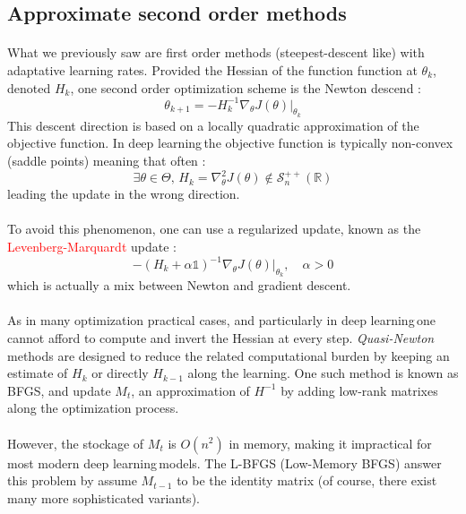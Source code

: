\documentclass[a4paper]{article}
\newcommand\dl{deep learning\,}
\begin{document}
{		\subsection{Approximate second order methods}
		{		
			\paragraph{} What we previously saw are first order methods (steepest-descent like) with adaptative learning rates. Provided the Hessian of the function function at $\theta_k$, denoted $H_k$, one second order optimization scheme is the Newton descend : 
			\begin{equation}
				\theta_{k+1} = -H_{k}^{-1}\nabla_\theta J(\theta)\vert_{\theta_k}
			\end{equation}
			This descent direction is based on a locally quadratic approximation of the objective function. In \dl the objective function is typically non-convex (saddle points) meaning that often : 
			\begin{equation}
				\exists \theta \in \Theta, \, H_k = \nabla_{\theta}^2 J(\theta) \notin \mathcal{S}_{n}^{++}(\mathbb{R})
			\end{equation}
			leading the update in the wrong direction. 
			
			\paragraph{} To avoid this phenomenon, one can use a regularized update, known as the \textcolor{red}{Levenberg-Marquardt} update : 
			\begin{equation}
				-\left(H_{k}+ \alpha \mathds{1}\right)^{-1}\nabla_\theta J(\theta)\vert_{\theta_k}, \quad \alpha >0
			\end{equation}
			which is actually a mix between Newton and gradient descent. 
			
			\paragraph{} As in many optimization practical cases, and particularly in \dl one cannot afford to compute and invert the Hessian at every step. \emph{Quasi-Newton} methods are designed to reduce the related computational burden by keeping an estimate of $H_k$ or directly $H_{k-1}$ along the learning. One such method is known as BFGS, and update $M_t$, an approximation of $H^{-1}$ by adding low-rank matrixes along the optimization process. 
			
			\paragraph{} However, the stockage of $M_t$ is $O(n^2)$ in memory, making it impractical for most modern \dl models. The L-BFGS (Low-Memory BFGS) answer this problem by assume $M_{t-1}$ to be the identity matrix (of course, there exist many more sophisticated variants). 
		}
	}
	
\end{document}

